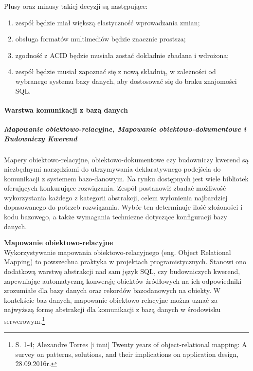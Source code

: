\documentclass[12pt, a4paper, twoside, openany]{book}
\begin{document}
Plusy oraz minusy takiej decyzji są następujące:
\begin{enumerate}[label=--]
    \item zespół będzie miał większą elastyczność wprowadzania zmian;
    \item obsługa formatów multimediów będzie znacznie prostsza;
    \item zgodność z ACID będzie musiała zostać dokładnie zbadana i wdrożona;
    \item zespół będzie musiał zapoznać się z nową składnią, w zależności od wybranego systemu bazy danych, aby dostosować się do braku znajomości SQL.
\end{enumerate}

\newpage
\paragraph{Warstwa komunikacji z bazą danych}
\subparagraph{Mapowanie obiektowo-relacyjne, Mapowanie obiektowo-dokumentowe i Budowniczy Kwerend\\}
Mapery obiektowo-relacyjne, obiektowo-dokumentowe czy budowniczy kwerend są niezbędnymi narzędziami do utrzymywania deklaratywnego podejścia do komunikacji z systemem bazo-danowym.
Na rynku dostępnych jest wiele bibliotek oferujących konkurujące rozwiązania.
Zespół postanowił zbadać możliwość wykorzystania każdego z kategorii abstrakcji, celem wyłonienia najbardziej dopasowanego do potrzeb rozwiązania.
Wybór ten determinuje ilość złożoności i kodu bazowego, a także wymagania techniczne dotyczące konfiguracji bazy danych.

\textbf{Mapowanie obiektowo-relacyjne\\}
Wykorzystywanie mapowania obiektowo-relacyjnego (eng. Object Relational Mapping) to powszechna praktyka w projektach programistycznych.
Stanowi ono dodatkową warstwę abstrakcji nad sam język SQL, czy budowniczych kwerend, zapewniając automatyczną konwersję obiektów źródłowych na ich odpowiedniki zrozumiałe dla bazy danych oraz rekordów bazodanowych na obiekty.
W kontekście baz danych, mapowanie obiektowo-relacyjne można uznać za najwyższą formę abstrakcji dla komunikacji z bazą danych w środowisku serwerowym.\footnote{S. 1-4; Alexandre Torres [i inni] Twenty years of object-relational mapping: A survey on patterns, solutions, and their implications on application design, 28.09.2016r.}
\end{document}
